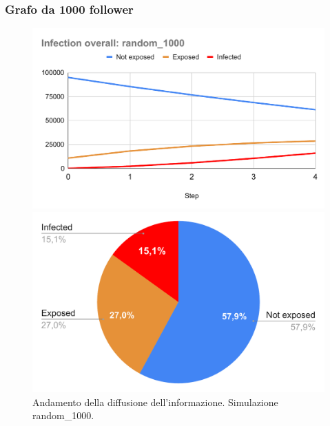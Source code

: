     \subsubsection{Grafo da 1000 follower}
        \begin{figure}[H]
            \centering
            \begin{minipage}[c]{0.55\textwidth}
                \includegraphics[width=\textwidth]{resources/charts/Infection overall_ random_1000.pdf}
            \end{minipage}
            \hfill
            \begin{minipage}[c]{0.44\textwidth}
                \includegraphics[width=\textwidth]{resources/charts/pie_random_1000.pdf}
            \end{minipage}
            \caption{Andamento della diffusione dell'informazione. Simulazione random\_1000.}
        \end{figure}
        
